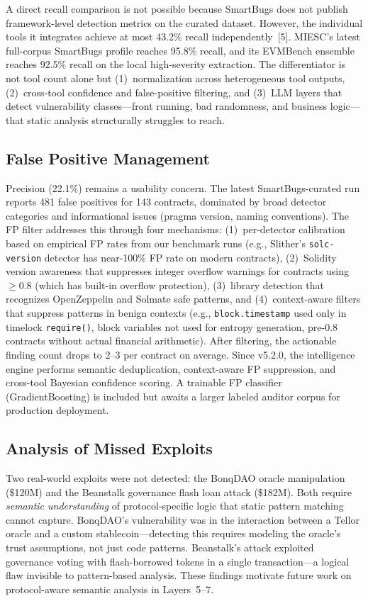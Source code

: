 \documentclass[conference]{IEEEtran}
\begin{document}
A direct recall comparison is not possible because SmartBugs does not publish framework-level detection metrics on the curated dataset. However, the individual tools it integrates achieve at most 43.2\% recall independently~[5]. MIESC's latest full-corpus SmartBugs profile reaches 95.8\% recall, and its EVMBench ensemble reaches 92.5\% recall on the local high-severity extraction. The differentiator is not tool count alone but (1)~normalization across heterogeneous tool outputs, (2)~cross-tool confidence and false-positive filtering, and (3)~LLM layers that detect vulnerability classes---front running, bad randomness, and business logic---that static analysis structurally struggles to reach.

\subsection{False Positive Management}

Precision (22.1\%) remains a usability concern. The latest SmartBugs-curated run reports 481 false positives for 143 contracts, dominated by broad detector categories and informational issues (pragma version, naming conventions). The FP filter addresses this through four mechanisms: (1)~per-detector calibration based on empirical FP rates from our benchmark runs (e.g., Slither's \texttt{solc-version} detector has near-100\% FP rate on modern contracts), (2)~Solidity version awareness that suppresses integer overflow warnings for contracts using $\geq$0.8 (which has built-in overflow protection), (3)~library detection that recognizes OpenZeppelin and Solmate safe patterns, and (4)~context-aware filters that suppress patterns in benign contexts (e.g., \texttt{block.timestamp} used only in timelock \texttt{require()}, block variables not used for entropy generation, pre-0.8 contracts without actual financial arithmetic). After filtering, the actionable finding count drops to 2--3 per contract on average. Since v5.2.0, the intelligence engine performs semantic deduplication, context-aware FP suppression, and cross-tool Bayesian confidence scoring. A trainable FP classifier (GradientBoosting) is included but awaits a larger labeled auditor corpus for production deployment.

\subsection{Analysis of Missed Exploits}

Two real-world exploits were not detected: the BonqDAO oracle manipulation (\$120M) and the Beanstalk governance flash loan attack (\$182M). Both require \emph{semantic understanding} of protocol-specific logic that static pattern matching cannot capture. BonqDAO's vulnerability was in the interaction between a Tellor oracle and a custom stablecoin---detecting this requires modeling the oracle's trust assumptions, not just code patterns. Beanstalk's attack exploited governance voting with flash-borrowed tokens in a single transaction---a logical flaw invisible to pattern-based analysis. These findings motivate future work on protocol-aware semantic analysis in Layers~5--7.
\end{document}
